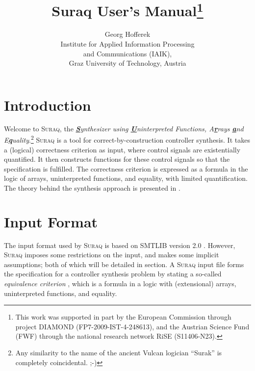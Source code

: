 \documentclass[a4paper]{article}
\newcommand\suraq{\mbox{\textsc{Suraq}}\xspace}
\newcommand\textbful[1]{\textbf{\underline{#1}}}
\begin{document}
\title{Suraq User's Manual\thanks{This work was supported in part by the
European Commission through project DIAMOND (FP7-2009-IST-4-248613),
and the Austrian Science Fund (FWF) through the national research
network RiSE (S11406-N23).}}

\author{Georg Hofferek\\
Institute for Applied Information Processing\\and Communications
(IAIK),\\
Graz University of Technology, Austria}
\date{}
\maketitle \pagebreak


\section{Introduction} \label{sec:introduction}

Welcome to \suraq, the \emph{\textbful{S}ynthesizer using
\textbful{U}ninterpreted Functions, A\textbful{r}rays \textbful{a}nd
E\textbful{q}uality}.\footnote{Any similarity to the name of the
ancient Vulcan logician ``Surak'' \cite{Memory_Alpha_Surak} is
completely coincidental. ;-)} \suraq is a tool for
correct-by-construction controller synthesis. It takes a (logical)
correctness criterion as input, where control signals are
existentially quantified. It then constructs functions for these
control signals so that the specification is fulfilled. The
correctness criterion is expressed as a formula in the logic of
arrays, uninterpreted functions, and equality, with limited
quantification. The theory behind the synthesis approach is presented
in \cite{Hoffer11}.


\section{Input Format} \label{sec:input_format}

The input format used by \suraq is based on SMTLIB version 2.0
\cite{SMTLIB}. However, \suraq imposes some restrictions on the
input, and makes some implicit assumptions; both of which will be
detailed in section. A \suraq input file forms the specification for
a controller synthesis problem by stating a so-called
\emph{equivalence criterion} \cite{Hoffer11}, which is a formula in a
logic with (extensional) arrays, uninterpreted functions, and
equality.
\end{document}
